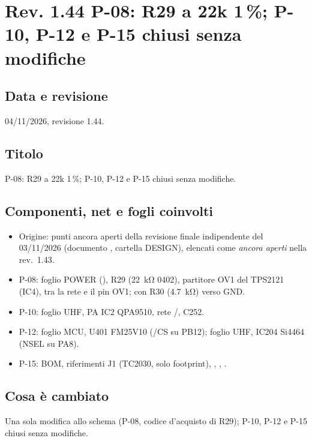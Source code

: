 \clearpage
\section[Rev. 1.44 -- P-08: R29 a 22k 1 \%; P-10, P-12, P-15 chiusi]{Rev. 1.44 \textendash{} P-08: R29 a 22k 1\,\%; P-10, P-12 e P-15 chiusi senza modifiche}

\subsection{Data e revisione}
04/11/2026, revisione 1.44.

\subsection{Titolo}
P-08: R29 a 22k 1\,\%; P-10, P-12 e P-15 chiusi senza modifiche.

\subsection{Componenti, net e fogli coinvolti}
\begin{itemize}
\item Origine: punti ancora aperti della revisione finale indipendente del 03/11/2026 (documento , cartella DESIGN), elencati come \emph{ancora aperti} nella rev.\ 1.43.
\item P-08: foglio POWER (), R29 (\SI{22}{\kilo\ohm} 0402), partitore OV1 del TPS2121 (IC4), tra la rete  e il pin OV1; con R30 (\SI{4.7}{\kilo\ohm}) verso GND.
\item P-10: foglio UHF, PA IC2 QPA9510, rete /, C252.
\item P-12: foglio MCU, U401 FM25V10 (/CS su PB12); foglio UHF, IC204 Si4464 (NSEL su PA8).
\item P-15: BOM, riferimenti J1 (TC2030, solo footprint), , , .
\end{itemize}

\subsection{Cosa è cambiato}
Una sola modifica allo schema (P-08, codice d'acquisto di R29); P-10, P-12 e P-15 chiusi senza modifiche.

